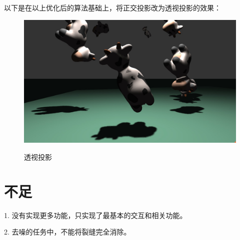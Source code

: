 \documentclass{article}
\begin{document}
	以下是在以上优化后的算法基础上，将正交投影改为透视投影的效果：
	\begin{figure}[htb]
		\caption{\label{table.label} 透视投影} \centering
		\begin{center}
			\includegraphics[width=5in]{orth.jpg}
			\label{figure.label}
		\end{center}
	\end{figure}

	\section{不足}
	1. 没有实现更多功能，只实现了最基本的交互和相关功能。
	
	2. 去噪的任务中，不能将裂缝完全消除。
\end{document}
